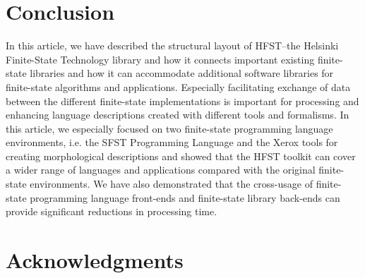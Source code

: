 \documentclass{llncs}
\begin{document}
\section{Conclusion}\label{hfst:conclusion}
In this article, we have described the structural layout of HFST--the Helsinki Finite-State Technology library
and how it connects important existing finite-state libraries and how it can accommodate additional software
libraries for finite-state algorithms and applications. Especially facilitating exchange of data between the different
finite-state implementations is important for processing and enhancing language descriptions created with different
tools and formalisms. In this article, we especially focused on two finite-state programming language environments, 
i.e. the SFST Programming Language and the Xerox tools for creating morphological descriptions and showed
that the HFST toolkit can cover a wider range of languages and applications compared with the original finite-state environments. We have also demonstrated that the cross-usage of finite-state programming language 
front-ends and finite-state library back-ends can provide significant reductions in processing time.

\section*{Acknowledgments}



\end{document}
